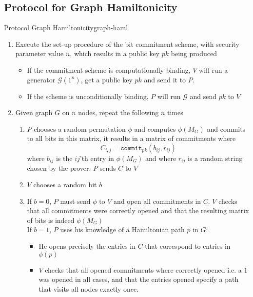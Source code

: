 \subsection{Protocol for Graph Hamiltonicity}
\begin{protocol}{Protocol Graph Hamiltonicity}{graph-haml}
  \begin{enumerate}
  	\item Execute the set-up procedure of the bit commitment scheme, with security parameter value $n$, which results in a public key $pk$ being produced
    \begin{itemize}
    	\item If the commitment scheme is computationally binding, $V$ will run a generator $\mathcal G(1^n)$, get a public key $pk$ and send it to $P$.
      \item If the scheme is unconditionally binding, $P$ will run $\mathcal G$ and send $pk$ to $V$
    \end{itemize}
    \item Given graph $G$ on $n$ nodes, repeat the following $n$ times
    \begin{enumerate}
    	\item $P$ chooses a random permutation $\phi$ and computes $\phi(M_G)$ and commits to all bits in this matrix, it results in a matrix of commitments where
      \[
          C_{i,j} = \mathtt{commit}_{pk}(b_{ij}, r_{ij})
      \]
      where $b_{ij}$ is the $ij$'th entry in $\phi(M_G)$ and where $r_{ij}$ is a random string chosen by the prover. $P$ sends $C$ to $V$
      \item $V$ chooses a random bit $b$
      \item If $b=0$, $P$ must send $\phi$ to $V$ and open all commitments in $C$. $V$ checks that all commitments were correctly opened and that the resulting matrix of bits is indeed $\phi(M_{G})$ \\
            If $b=1$, $P$ uses his knowledge of a Hamiltonian path $p$ in $G$:
            \begin{itemize}
            	\item He opens precisely the entries in $C$ that correspond to entries in $\phi(p)$
              \item $V$ checks that all opened commitments where correctly opened i.e. a $1$ was opened in all cases, and that the entries opened specify a path that visits all nodes exactly once.
            \end{itemize}
    \end{enumerate}
  \end{enumerate}
\end{protocol}
